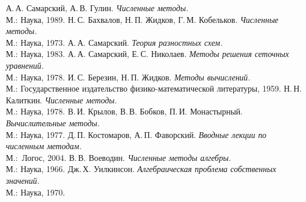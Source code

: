 \documentclass[11pt,a4paper,twoside]{report}
\numberwithin{equation}{section}
\theoremstyle{definition}
\theoremstyle{plain}
\begin{document}
\newpage
%
{}
{}
\begin{thebibliography}{9}

 А.\,А. Самарский, А.\,В. Гулин. \emph{Численные методы.}\\
М.: Наука, 1989.
 Н.\,С. Бахвалов, Н.\,П. Жидков, Г.\,М. Кобельков.
\emph{Численные методы.}\\М.: Наука, 1973.
 А.\,А. Самарский. \emph{Теория разностных схем.}\\
М.: Наука, 1983.
 А.\,А. Самарский, Е.\,С. Николаев. \emph{Методы решения
сеточных уравнений.}\\М.: Наука, 1978.
 И.\,С. Березин, Н.\,П. Жидков. \emph{Методы вычислений.}\\
М.: Государственное издательство физико-математической литературы, 1959.
 Н.\,Н. Калиткин. \emph{Численные методы}.\\М.: Наука, 1978.
 В.\,И. Крылов, В.\,В. Бобков, П.\,И. Монастырный.
\emph{Вычислительные методы.}\\М.: Наука, 1977.
 Д.\,П. Костомаров, А.\,П. Фаворский.
\emph{Вводные лекции по численным методам.}\\М.:~Логос, 2004.
В.\,В. Воеводин. \emph{Численные методы алгебры.}\\М.: Наука,
1966.
Дж.\,Х. Уилкинсон. \emph{Алгебраическая проблема собственных
значений.}\\М.: Наука, 1970.

\end{thebibliography}
\end{document}
